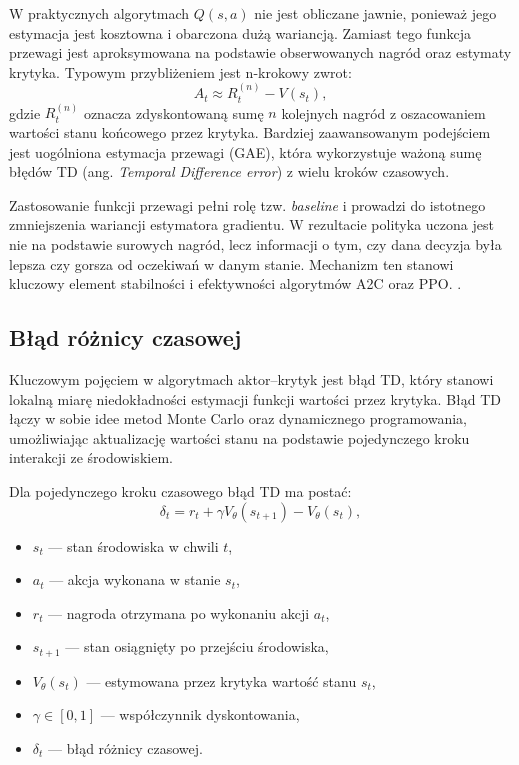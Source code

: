 W praktycznych algorytmach $Q(s,a)$ nie jest obliczane jawnie, ponieważ jego estymacja jest
kosztowna i obarczona dużą wariancją. Zamiast tego funkcja przewagi jest aproksymowana
na podstawie obserwowanych nagród oraz estymaty krytyka. Typowym przybliżeniem jest
n-krokowy zwrot:
\[
A_t \approx R_t^{(n)} - V(s_t),
\]
gdzie $R_t^{(n)}$ oznacza zdyskontowaną sumę $n$ kolejnych nagród z oszacowaniem wartości
stanu końcowego przez krytyka. Bardziej zaawansowanym podejściem jest uogólniona estymacja
przewagi (GAE), która wykorzystuje ważoną sumę błędów TD (ang. \textit{Temporal Difference error}) z wielu kroków czasowych.

Zastosowanie funkcji przewagi pełni rolę tzw. \emph{baseline} i prowadzi do istotnego zmniejszenia
wariancji estymatora gradientu. W rezultacie polityka uczona jest nie na podstawie surowych nagród,
lecz informacji o tym, czy dana decyzja była lepsza czy gorsza od oczekiwań w danym stanie.
Mechanizm ten stanowi kluczowy element stabilności i efektywności algorytmów A2C oraz PPO. \cite{mnih2016,Schulman2017PPO, sutton2018temporal}.

\subsection*{Błąd różnicy czasowej}

Kluczowym pojęciem w algorytmach aktor--krytyk jest błąd TD, który stanowi lokalną miarę
niedokładności estymacji funkcji wartości przez krytyka.
Błąd TD łączy w sobie idee metod Monte Carlo oraz dynamicznego programowania,
umożliwiając aktualizację wartości stanu na podstawie pojedynczego kroku interakcji
ze środowiskiem.

Dla pojedynczego kroku czasowego błąd TD ma postać:
\[
\delta_t = r_t + \gamma V_\theta(s_{t+1}) - V_\theta(s_t),
\]

\begin{itemize}
	\item $s_t$ --- stan środowiska w chwili $t$,
	\item $a_t$ --- akcja wykonana w stanie $s_t$,
	\item $r_t$ --- nagroda otrzymana po wykonaniu akcji $a_t$,
	\item $s_{t+1}$ --- stan osiągnięty po przejściu środowiska,
	\item $V_\theta(s_t)$ --- estymowana przez krytyka wartość stanu $s_t$,
	\item $\gamma \in [0,1]$ --- współczynnik dyskontowania,
	\item $\delta_t$ --- błąd różnicy czasowej.
\end{itemize}


